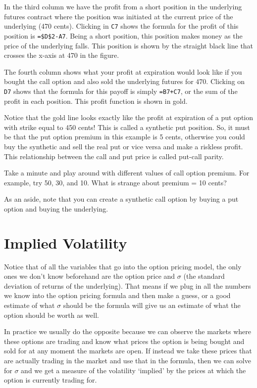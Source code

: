 \documentclass[
  letterpaper,
  DIV=11,
  numbers=noendperiod]{scrreprt}
\begin{document}
In the third column we have the profit from a short position in the
underlying futures contract where the position was initiated at the
current price of the underlying (470 cents). Clicking in \texttt{C7}
shows the formula for the profit of this position is
\texttt{=\$D\$2-A7}. Being a short position, this position makes money
as the price of the underlying falls. This position is shown by the
straight black line that crosses the x-axis at 470 in the figure.

The fourth column shows what your profit at expiration would look like
if you bought the call option and also sold the underlying futures for
470. Clicking on \texttt{D7} shows that the formula for this payoff is
simply \texttt{=B7+C7}, or the sum of the profit in each position. This
profit function is shown in gold.

Notice that the gold line looks exactly like the profit at expiration of
a put option with strike equal to 450 cents! This is called a synthetic
put position. So, it must be that the put option premium in this example
is 5 cents, otherwise you could buy the synthetic and sell the real put
or vice versa and make a riskless profit. This relationship between the
call and put price is called put-call parity.

Take a minute and play around with different values of call option
premium. For example, try 50, 30, and 10. What is strange about premium
= 10 cents?

As an aside, note that you can create a synthetic call option by buying
a put option and buying the underlying.

\hypertarget{implied-volatility}{%
\section{Implied Volatility}\label{implied-volatility}}

Notice that of all the variables that go into the option pricing model,
the only ones we don't know beforehand are the option price and
\(\sigma\) (the standard deviation of returns of the underlying). That
means if we plug in all the numbers we know into the option pricing
formula and then make a guess, or a good estimate of what \(\sigma\)
should be the formula will give us an estimate of what the option should
be worth as well.

In practice we usually do the opposite because we can observe the
markets where these options are trading and know what prices the option
is being bought and sold for at any moment the markets are open. If
instead we take these prices that are actually trading in the market and
use that in the formula, then we can solve for \(\sigma\) and we get a
measure of the volatility `implied' by the prices at which the option is
currently trading for.
\end{document}
